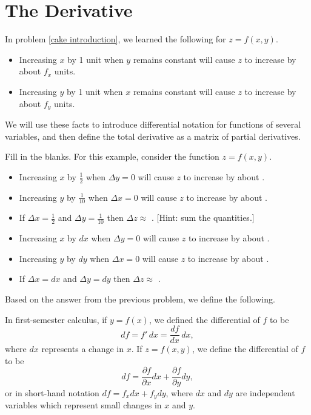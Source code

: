 \section{The Derivative}
\begin{remark}
 In problem \ref{cake introduction}, we learned the following for  $z=f(x,y)$.
\begin{itemize}
 \item Increasing $x$ by 1 unit when $y$ remains constant will cause $z$ to increase by about $f_x$ units.
 \item Increasing $y$ by 1 unit when $x$ remains constant will cause $z$ to increase by about $f_y$ units.
\end{itemize}
We will use these facts to introduce differential notation for functions of several variables, and then define the total derivative as a matrix of partial derivatives.
\end{remark}

\begin{problem}
 Fill in the blanks. For this example, consider the function $z=f(x,y)$.
\begin{itemize}
 \item Increasing $x$ by $\frac{1}{2}$ when $\Delta y=0$ will cause $z$ to increase by about \blank{1cm}.
 \item Increasing $y$ by $\frac{1}{10}$ when $\Delta x=0$ will cause $z$ to increase by about \blank{1cm}.
 \item If $\Delta x=\frac{1}{2}$ and $\Delta y=\frac{1}{10}$ then $\Delta z\approx$ \blank{2cm}. [Hint: sum the quantities.]
 \item Increasing $x$ by $dx$ when $\Delta y=0$ will cause $z$ to increase by about \blank{1cm}.
 \item Increasing $y$ by $dy$ when $\Delta x=0$ will cause $z$ to increase by about \blank{1cm}.
 \item If $\Delta x=dx$ and $\Delta y=dy$ then $\Delta z\approx$ \blank{2cm}.
\end{itemize}
\end{problem}

Based on the answer from the previous problem, we define the following.
\begin{definition}
In first-semester calculus, if $y=f(x)$, we defined the differential of $f$ to be
$$df = f'\,dx=\frac{df}{dx}\,dx,$$ where $dx$ represents a change in $x$.
If $z=f(x,y)$, we define the differential of $f$ to be 
$$df= \frac{\partial f}{\partial x}dx+ \frac{\partial f}{\partial y}dy,$$
or in short-hand notation $df=f_xdx+f_ydy$, 
where $dx$ and $dy$ are independent variables which represent small changes in $x$ and $y$.
\end{definition}

